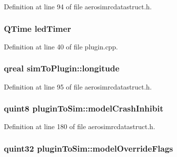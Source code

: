 Definition at line 94 of file aerosimrcdatastruct.\-h.

\hypertarget{group___aero_sim_r_c_ga56b5b977fe04df5bdb2e4ea63b385692}{
\subsubsection[{led\-Timer}]{\setlength{\rightskip}{0pt plus 5cm}Q\-Time led\-Timer}}\label{group___aero_sim_r_c_ga56b5b977fe04df5bdb2e4ea63b385692}


Definition at line 40 of file plugin.\-cpp.

\hypertarget{group___aero_sim_r_c_ga3b47af6ee67e1149980bd672fce0f91d}{
\subsubsection[{longitude}]{\setlength{\rightskip}{0pt plus 5cm}qreal sim\-To\-Plugin\-::longitude}}\label{group___aero_sim_r_c_ga3b47af6ee67e1149980bd672fce0f91d}


Definition at line 95 of file aerosimrcdatastruct.\-h.

\hypertarget{group___aero_sim_r_c_gac766c17be7565d11f169ec43dac2113d}{
\subsubsection[{model\-Crash\-Inhibit}]{\setlength{\rightskip}{0pt plus 5cm}quint8 plugin\-To\-Sim\-::model\-Crash\-Inhibit}}\label{group___aero_sim_r_c_gac766c17be7565d11f169ec43dac2113d}


Definition at line 180 of file aerosimrcdatastruct.\-h.

\hypertarget{group___aero_sim_r_c_ga0fc062ffe3e17dd8ae14a181fbb50c1f}{
\subsubsection[{model\-Override\-Flags}]{\setlength{\rightskip}{0pt plus 5cm}quint32 plugin\-To\-Sim\-::model\-Override\-Flags}}\label{group___aero_sim_r_c_ga0fc062ffe3e17dd8ae14a181fbb50c1f}


